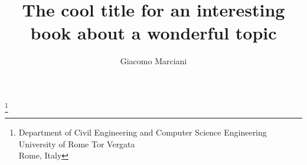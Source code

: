 \title{The cool title for an interesting book about a wonderful topic}

\author{Giacomo Marciani}
\thanks{Department of Civil Engineering and Computer Science Engineering\\
University of Rome Tor Vergata\\
Rome, Italy}

\maketitle




\tableofcontents




